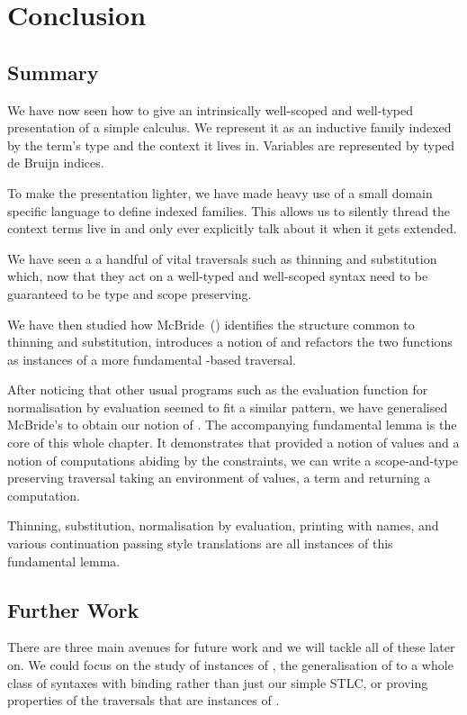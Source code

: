 \chapter{Conclusion}

\section{Summary}

We have now seen how to give an intrinsically well-scoped and well-typed
presentation of a simple calculus. We represent it as an inductive family
indexed by the term's type and the context it lives in. Variables are
represented by typed de Bruijn indices.

To make the presentation lighter, we have made heavy use of a small domain
specific language to define indexed families. This allows us to silently
thread the context terms live in and only ever explicitly talk about it
when it gets extended.

We have seen a a handful of vital traversals such as thinning and substitution
which, now that they act on a well-typed and well-scoped syntax need to be
guaranteed to be type and scope preserving.

We have then studied how McBride~(\citeyear{mcbride2005type}) identifies the
structure common to thinning and substitution, introduces a notion of 
and refactors the two functions as instances of a more fundamental -based
traversal.

After noticing that other usual programs such as the evaluation function for
normalisation by evaluation seemed to fit a similar pattern, we have generalised
McBride's  to obtain our notion of . The accompanying
fundamental lemma is the core of this whole chapter. It demonstrates that
provided a notion of values and a notion of computations abiding by the
 constraints, we can write a scope-and-type preserving traversal
taking an environment of values, a term and returning a computation.

Thinning, substitution, normalisation by evaluation, printing with names, and
various continuation passing style translations are all instances of this
fundamental lemma.

\section{Further Work}

There are three main avenues for future work and we will tackle all of these later on.
We could focus on the study of instances of , the generalisation of
 to a whole class of syntaxes with binding rather than just our simple
STLC, or proving properties of the traversals that are instances of .

